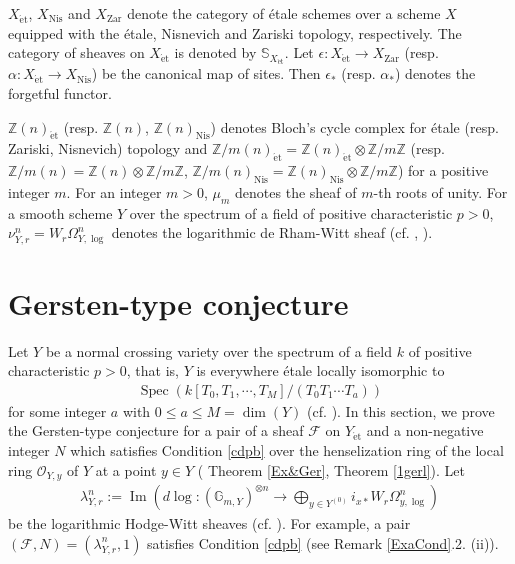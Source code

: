 \documentclass{article}
\newcommand{\spec}{\operatorname{Spec}}
\newcommand{\et}{\mathrm{\acute{e}t}}
\newcommand{\Nis}{\mathrm{Nis}}
\newcommand{\Zar}{\mathrm{Zar}}
\begin{document}
$X_{\et}$, $X_{\Nis}$ and $X_{\Zar}$
denote the category of \'{e}tale schemes over a scheme $X$
equipped with
the \'{e}tale, Nisnevich and Zariski topology, respectively.
The category of sheaves on $X_{\et}$ is denoted by $\mathbb{S}_{X_{\et}}$.
Let $\epsilon: X_{\et}\to X_{\Zar}$ (resp. 
$\alpha: X_{\et}\to X_{\Nis}$)
be the canonical map of sites.
Then $\epsilon_{*}$ (resp. $\alpha_{*}$) denotes the forgetful functor.

$\mathbb{Z}(n)_{\et}$ (resp. $\mathbb{Z}(n)$, $\mathbb{Z}(n)_{\Nis}$)
denotes Bloch’s cycle complex for
\'{e}tale (resp. Zariski, Nisnevich) topology and 
$\mathbb{Z}/m(n)_{\et}=\mathbb{Z}(n)_{\et}\otimes\mathbb{Z}/m\mathbb{Z}$
(resp. $\mathbb{Z}/m(n)=\mathbb{Z}(n)\otimes\mathbb{Z}/m\mathbb{Z}$,
$\mathbb{Z}/m(n)_{\Nis}=\mathbb{Z}(n)_{\Nis}\otimes\mathbb{Z}/m\mathbb{Z}$)
for a positive integer $m$.
For an integer $m>0$, $\mu_{m}$ denotes the sheaf of $m$-th
roots of unity.
For a smooth scheme $Y$ over the spectrum of a field of positive characteristic
$p>0$, $\nu^{n}_{Y, r}=W_{r}\Omega_{Y, \log}^{n}$ denotes
the logarithmic de Rham-Witt sheaf
(cf. \cite{I}, \cite[p.575, Definition 2.6]{Sh}).
%
%


%
\section{Gersten-type conjecture}\label{TGer}
Let $Y$ be a normal crossing variety over the spectrum of a field $k$ of positive characteristic $p>0$,
that is,
$Y$ is everywhere \'{e}tale locally isomorphic to
%
\begin{align*}
\spec(k[T_{0}, T_{1}, \cdots, T_{M}]/(T_{0}T_{1}\cdots T_{a}))    
\end{align*}
%
for some integer $a$ with $0\leq a\leq M=\operatorname{dim}(Y)$
(cf. \cite[pp.180--181, Definition 2.1]{SaR}).
In this section, 
we prove the Gersten-type conjecture 
for a pair of a sheaf $\mathcal{F}$ on $Y_{\et}$ 
and a non-negative integer $N$
which satisfies
Condition \ref{cdpb}
over the henselization ring of the local ring $\mathcal{O}_{Y, y}$ of $Y$ at a point $y\in Y$
( Theorem \ref{Ex&Ger}, Theorem \ref{1gerl}).
Let
%
\begin{align*}
\lambda^{n}_{Y, r}
:=
\operatorname{Im}\left(
d\log:
(\mathbb{G}_{m, Y})^{\otimes n}
\to
\displaystyle 
\bigoplus_{y\in Y^{(0)}}
i_{x *}W_{r}\Omega^{n}_{y, \log}
\right)
\end{align*}
%
be the logarithmic Hodge-Witt sheaves (cf. \cite[p.726, Definition 3.1.1 (1)]{SaL}). 
For example, a pair $(\mathcal{F}, N)=(\lambda^{n}_{Y, r}, 1)$ satisfies Condition \ref{cdpb}
(see Remark \ref{ExaCond}.2. (ii)).
  
\end{document}
